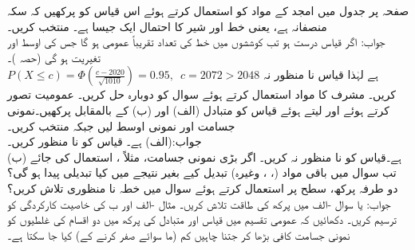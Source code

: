 \quad 
صفحہ  پر جدول  میں امجد کے مواد کو استعمال کرتے ہوئے اس قیاس کو پرکھیں کہ سکہ منصفانہ ہے، یعنی خط اور شیر کا احتمال ایک جیسا ہے۔ منتخب کریں۔\\
جواب:\quad
اگر قیاس  درست ہو تب  کوششوں میں خط کی تعداد تقریباً عمومی ہو گا جس کی اوسط  اور تغیریت  ہو گی (حصہ )۔\\
$P(X\le c)=\Phi(\tfrac{c-2020}{\sqrt{1010}})=0.95,\,\,\,c=2072>2048$
ہے لہٰذا قیاس نا منظور نہ کریں۔
\quad
مشرف کا مواد استعمال کرتے ہوئے سوال  کو دوبارہ حل کریں۔
\quad
عمومیت تصور کرتے ہوئے اور  لیتے ہوئے قیاس  کو متبادل (الف)  اور (ب)  کے بالمقابل پرکھیں۔نمونی جسامت  اور نمونی اوسط  لیں جبکہ  منتخب کریں۔\\
جواب:\quad (الف)  ہے۔ قیاس کو نا منظور کریں۔\\
(ب)  ہے۔قیاس کو نا منظور نہ کریں۔
\quad
اگر بڑی نمونی جسامت، مثلاً ، استعمال کی جائے تب سوال  میں باقی مواد (، ، وغیرہ) تبدیل کیے بغیر نتیجے میں کیا تبدیلی پیدا ہو گی؟ 
\quad
دو طرفہ پرکھ،  سطح پر استعمال کرتے ہوئے سوال  میں خطہ نا منظوری تلاش کریں؟\\
جواب:\quad {} یا 
\quad
سوال -الف میں پرکھ کی طاقت تلاش کریں۔
\quad
مثال -الف اور ب کی خاصیت کارکردگی کو ترسیم کریں۔  
\quad
دکھائیں کہ عمومی تقسیم میں قیاس  اور متبادل  کی پرکھ میں  دو اقسام کی غلطیوں کو نمونی جسامت کافی بڑھا کر  جتنا چاہیں کم (ما سوائے صفر کرنے کے) کیا جا سکتا ہے۔

